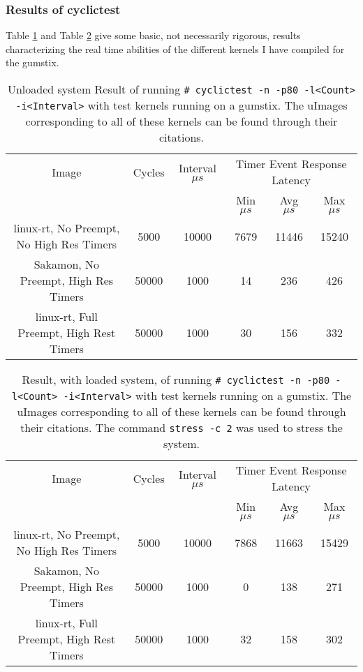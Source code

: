 \documentclass{article}
\begin{document}
\subsubsection{Results of cyclictest}
Table \ref{tab:cyclictestResultsNoLoad} and Table \ref{tab:cyclictestResults} give some basic, not necessarily rigorous, results characterizing the real time abilities of the different kernels I have compiled for the gumstix.
\begin{table}[h]
\centering
\hspace*{-1cm}\begin{tabular}{|c|c|c|ccc|}
\hline
Image & Cycles & Interval $\mu s$ & \multicolumn{3}{|c|}{Timer Event Response Latency}\\
      &        &                  & Min $\mu s$  & Avg $\mu s$  & Max $ \mu s$\\
\hline
linux-rt, No Preempt, No High Res Timers\cite{worstCaseKern}&5000&10000&7679&11446&15240\\
Sakamon, No Preempt, High Res Timers\cite{sakamonKern}&50000&1000&14&236&426\\
linux-rt, Full Preempt, High Rest Timers\cite{rtKern}&50000&1000&30&156&332\\
\hline
\end{tabular}
\caption{Unloaded system Result of running \texttt{\# cyclictest -n -p80 -l<Count> -i<Interval>} with test kernels running on a gumstix.  The uImages corresponding to all of these kernels can be found through their citations.}
\label{tab:cyclictestResultsNoLoad}
\end{table}

\begin{table}[h]
\centering
\hspace*{-1cm}\begin{tabular}{|c|c|c|ccc|}
\hline
Image & Cycles & Interval $\mu s$ & \multicolumn{3}{|c|}{Timer Event Response Latency}\\
      &        &                  & Min $\mu s$  & Avg $\mu s$  & Max $ \mu s$\\
\hline
linux-rt, No Preempt, No High Res Timers\cite{worstCaseKern}&5000&10000&7868&11663&15429\\
Sakamon, No Preempt, High Res Timers\cite{sakamonKern}&50000&1000&0&138&271\\
linux-rt, Full Preempt, High Rest Timers\cite{rtKern}&50000&1000&32&158&302\\
\hline
\end{tabular}
\caption{Result, with loaded system, of running \texttt{\# cyclictest -n -p80 -l<Count> -i<Interval>} with test kernels running on a gumstix.  The uImages corresponding to all of these kernels can be found through their citations. The command \texttt{stress -c 2} was used to stress the system.  \cite{stressCommand}}
\label{tab:cyclictestResults}
\end{table}
\end{document}

